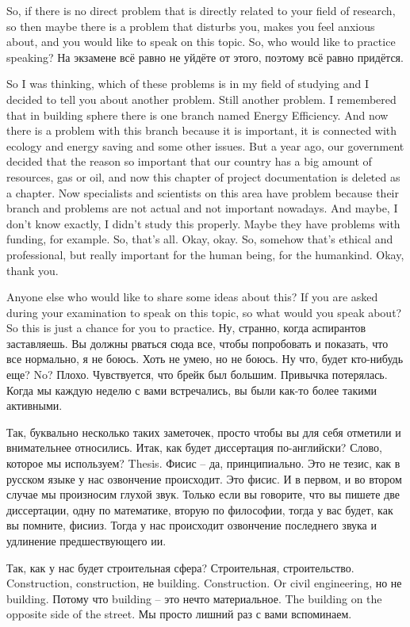 \documentclass[main.tex]{subfiles}
\begin{document}
So, if there is no direct problem that is directly related to your field of research, so then maybe there is a problem that disturbs you, makes you feel anxious about, and you would like to speak on this topic.
So, who would like to practice speaking?
На экзамене всё равно не уйдёте от этого, поэтому всё равно придётся.

So I was thinking, which of these problems is in my field of studying and I decided to tell you about another problem.
Still another problem.
I remembered that in building sphere there is one branch named Energy Efficiency.
And now there is a problem with this branch because it is important, it is connected with ecology and energy saving and some other issues.
But a year ago, our government decided that the reason so important that our country has a big amount of resources, gas or oil, and now this chapter of project documentation is deleted as a chapter.
Now specialists and scientists on this area have problem because their branch and problems are not actual and not important nowadays.
And maybe, I don't know exactly, I didn't study this properly.
Maybe they have problems with funding, for example.
So, that's all.
Okay, okay.
So, somehow that's ethical and professional, but really important for the human being, for the humankind.
Okay, thank you.

Anyone else who would like to share some ideas about this?
If you are asked during your examination to speak on this topic, so what would you speak about?
So this is just a chance for you to practice.
Ну, странно, когда аспирантов заставляешь.
Вы должны рваться сюда все, чтобы попробовать и показать, что все нормально, я не боюсь.
Хоть не умею, но не боюсь.
Ну что, будет кто-нибудь еще?
No?
Плохо.
Чувствуется, что брейк был большим.
Привычка потерялась.
Когда мы каждую неделю с вами встречались, вы были как-то более такими активными.

Так, буквально несколько таких заметочек, просто чтобы вы для себя отметили и внимательнее относились.
Итак, как будет диссертация по-английски?
Слово, которое мы используем?
Thesis.
Фисис -- да, принципиально.
Это не тезис, как в русском языке у нас озвончение происходит.
Это фисис.
И в первом, и во втором случае мы произносим глухой звук.
Только если вы говорите, что вы пишете две диссертации, одну по математике, вторую по философии, тогда у вас будет, как вы помните, фисииз.
Тогда у нас происходит озвончение последнего звука и удлинение предшествующего ии.

Так, как у нас будет строительная сфера?
Строительная, строительство.
Construction, construction, не building.
Construction.
Or civil engineering, но не building.
Потому что building -- это нечто материальное.
The building on the opposite side of the street.
Мы просто лишний раз с вами вспоминаем.
\end{document}
